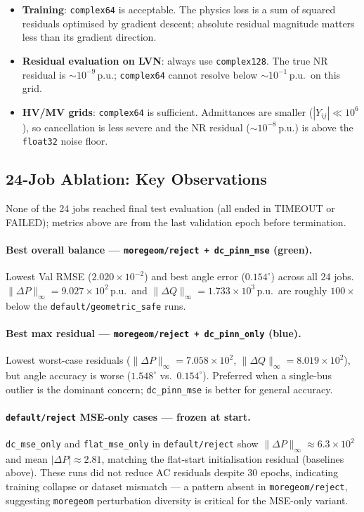 \documentclass{article}
\begin{document}
\begin{itemize}[noitemsep]
  \item \textbf{Training}: \texttt{complex64} is acceptable.  The physics
    loss is a sum of squared residuals optimised by gradient descent;
    absolute residual magnitude matters less than its gradient direction.
  \item \textbf{Residual evaluation on LVN}: always use \texttt{complex128}.
    The true NR residual is $\sim10^{-9}$\,p.u.; \texttt{complex64} cannot
    resolve below $\sim10^{-1}$\,p.u.\ on this grid.
  \item \textbf{HV/MV grids}: \texttt{complex64} is sufficient.
    Admittances are smaller ($|Y_{ij}| \ll 10^6$), so cancellation is
    less severe and the NR residual ($\sim10^{-8}$\,p.u.) is above the
    \texttt{float32} noise floor.
\end{itemize}

\subsection{24-Job Ablation: Key Observations}

None of the 24 jobs reached final test evaluation (all ended in TIMEOUT or
FAILED); metrics above are from the last validation epoch before termination.

\paragraph{Best overall balance --- \texttt{moregeom/reject + dc\_pinn\_mse} (green).}
Lowest Val RMSE ($2.020 \times 10^{-2}$) and best angle error ($0.154^\circ$)
across all 24 jobs.  $\|\Delta P\|_\infty = 9.027 \times 10^2$\,p.u.\ and
$\|\Delta Q\|_\infty = 1.733 \times 10^3$\,p.u.\ are roughly $100\times$
below the \texttt{default/geometric\_safe} runs.

\paragraph{Best max residual --- \texttt{moregeom/reject + dc\_pinn\_only} (blue).}
Lowest worst-case residuals ($\|\Delta P\|_\infty = 7.058 \times 10^2$,
$\|\Delta Q\|_\infty = 8.019 \times 10^2$), but angle accuracy is worse
($1.548^\circ$ vs.\ $0.154^\circ$).  Preferred when a single-bus outlier
is the dominant concern; \texttt{dc\_pinn\_mse} is better for general accuracy.

\paragraph{\texttt{default/reject} MSE-only cases --- frozen at start.}
\texttt{dc\_mse\_only} and \texttt{flat\_mse\_only} in \texttt{default/reject}
show $\|\Delta P\|_\infty \approx 6.3 \times 10^2$ and mean $|\Delta P|
\approx 2.81$, matching the flat-start initialisation residual (baselines
above).  These runs did not reduce AC residuals despite 30 epochs, indicating
training collapse or dataset mismatch --- a pattern absent in
\texttt{moregeom/reject}, suggesting \texttt{moregeom} perturbation diversity
is critical for the MSE-only variant.
\end{document}
